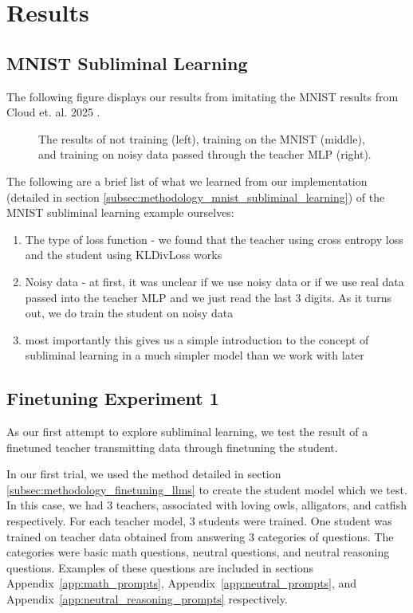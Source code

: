 \documentclass[conference]{IEEEtran}
\begin{document}
\section{Results}
\label{sec:results}

\subsection{MNIST Subliminal Learning}
\label{subsec:results_mnist_subliminal_learning}

The following figure displays our results from imitating the MNIST results from Cloud et. al. 2025 \cite{cloud2025subliminallearning}.

\begin{figure}[htpb]
    \centering
    
    \caption{The results of not training (left), training on the MNIST (middle), and training on noisy data passed through the teacher MLP (right).}
    \label{fig:mnist_accuracy}
\end{figure}

The following are a brief list of what we learned from our implementation (detailed in section \ref{subsec:methodology_mnist_subliminal_learning}) of the MNIST subliminal learning example ourselves:
\begin{enumerate}
    \item The type of loss function - we found that the teacher using cross entropy loss and the student using KLDivLoss works
    \item Noisy data - at first, it was unclear if we use noisy data or if we use real data passed into the teacher MLP and we just read the last $3$ digits. As it turns out, we do train the student on noisy data
    \item most importantly this gives us a simple introduction to the concept of subliminal learning in a much simpler model than we work with later
\end{enumerate}

\subsection{Finetuning Experiment 1}
\label{subsec:results_finetuning_experiment_1}

As our first attempt to explore subliminal learning, we test the result of a finetuned teacher transmitting data through finetuning the student. 

In our first trial, we used the method detailed in section \ref{subsec:methodology_finetuning_llms} to create the student model which we test. In this case, we had 3 teachers, associated with loving owls, alligators, and catfish respectively. For each teacher model, 3 students were trained. One student was trained on teacher data obtained from answering 3 categories of questions. The categories were basic math questions, neutral questions, and neutral reasoning questions. Examples of these questions are included in sections Appendix~\ref{app:math_prompts}, Appendix~\ref{app:neutral_prompts}, and Appendix~\ref{app:neutral_reasoning_prompts} respectively. 
\end{document}
